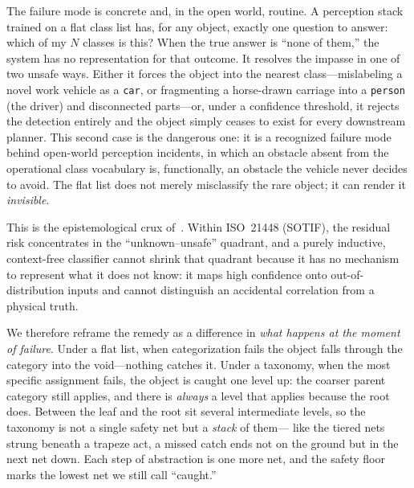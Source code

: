 \documentclass[conference]{IEEEtran}
\begin{document}
The failure mode is concrete and, in the open world, routine. A perception stack
trained on a flat class list has, for any object, exactly one question to answer:
which of my $N$ classes is this? When the true answer is ``none of them,'' the
system has no representation for that outcome. It resolves the impasse in one of
two unsafe ways. Either it forces the object into the nearest class---mislabeling
a novel work vehicle as a \texttt{car}, or fragmenting a horse-drawn carriage into
a \texttt{person} (the driver) and disconnected parts---or, under a confidence
threshold, it rejects the detection entirely and the object simply ceases to
exist for every downstream planner. This second case is the dangerous one: it is
a recognized failure mode behind open-world perception incidents, in which an
obstacle absent from the operational class vocabulary is, functionally, an
obstacle the vehicle never decides to avoid. The flat list does not merely
misclassify the rare object; it can render it \emph{invisible}.

This is the epistemological crux of~\cite{schaller_patterns}. Within ISO~21448
(SOTIF), the residual risk concentrates in the ``unknown--unsafe'' quadrant, and
a purely inductive, context-free classifier cannot shrink that quadrant because
it has no mechanism to represent what it does not know: it maps high confidence
onto out-of-distribution inputs and cannot distinguish an accidental correlation
from a physical truth.

We therefore reframe the remedy as a difference in \emph{what happens at the
moment of failure}. Under a flat list, when categorization fails the object falls
through the category into the void---nothing catches it. Under a taxonomy, when
the most specific assignment fails, the object is caught one level up: the coarser
parent category still applies, and there is \emph{always} a level that applies
because the root does. Between the leaf and the root sit several intermediate
levels, so the taxonomy is not a single safety net but a \emph{stack} of them---
like the tiered nets strung beneath a trapeze act, a missed catch ends not on the
ground but in the next net down. Each step of abstraction is one more net, and the
safety floor marks the lowest net we still call ``caught.''
\end{document}
